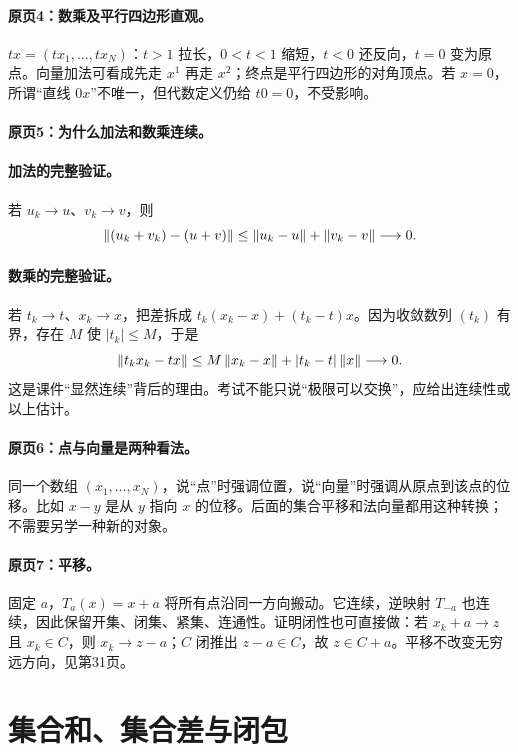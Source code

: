 \paragraph{原页4：数乘及平行四边形直观。}$t x=(t x_1,\ldots,t x_N)$：$t>1$ 拉长，$0<t<1$ 缩短，$t<0$ 还反向，$t=0$ 变为原点。向量加法可看成先走 $x^1$ 再走 $x^2$；终点是平行四边形的对角顶点。若 $x=0$，所谓“直线 $0x$”不唯一，但代数定义仍给 $t0=0$，不受影响。



\paragraph{原页5：为什么加法和数乘连续。}\paragraph{加法的完整验证。} 若 $u_k\to u$、$v_k\to v$，则
\[\left\lVert(u_k+v_k)-(u+v)\right\rVert\le\left\lVert u_k-u\right\rVert+\left\lVert v_k-v\right\rVert\longrightarrow0.\]
\paragraph{数乘的完整验证。} 若 $t_k\to t$、$x_k\to x$，把差拆成 $t_k(x_k-x)+(t_k-t)x$。因为收敛数列 $(t_k)$ 有界，存在 $M$ 使 $|t_k|\le M$，于是
\[\left\lVert t_kx_k-tx\right\rVert\le M\left\lVert x_k-x\right\rVert+|t_k-t|\left\lVert x\right\rVert\longrightarrow0.\]
这是课件“显然连续”背后的理由。考试不能只说“极限可以交换”，应给出连续性或以上估计。



\paragraph{原页6：点与向量是两种看法。}同一个数组 $(x_1,\ldots,x_N)$，说“点”时强调位置，说“向量”时强调从原点到该点的位移。比如 $x-y$ 是从 $y$ 指向 $x$ 的位移。后面的集合平移和法向量都用这种转换；不需要另学一种新的对象。



\paragraph{原页7：平移。}固定 $a$，$T_a(x)=x+a$ 将所有点沿同一方向搬动。它连续，逆映射 $T_{-a}$ 也连续，因此保留开集、闭集、紧集、连通性。证明闭性也可直接做：若 $x_k+a\to z$ 且 $x_k\in C$，则 $x_k\to z-a$；$C$ 闭推出 $z-a\in C$，故 $z\in C+a$。平移不改变无穷远方向，见第31页。



\clearpage\section{集合和、集合差与闭包}\label{g:109:8}

